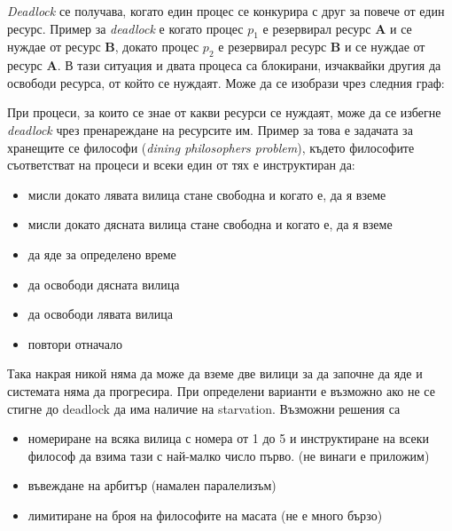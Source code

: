 \documentclass[fleqn,12pt]{article}
\begin{document}
\textit{Deadlock} се получава, когато един процес се конкурира с друг за повече от един ресурс.
Пример за \textit{deadlock} е когато процес \textbf{$p_1$} е резервирал ресурс \textbf{A} и се нуждае от ресурс \textbf{B}, докато процес \textbf{$p_2$} е резервирал ресурс \textbf{B} и се нуждае от ресурс \textbf{A}.
В тази ситуация и двата процеса са блокирани, изчаквайки другия да освободи ресурса, от който се нуждаят.
Може да се изобрази чрез следния граф:


\begin{center}
\end{center}

При процеси, за които се знае от какви ресурси се нуждаят, може да се избегне \textit{deadlock} чрез пренареждане на ресурсите им.
Пример за това е задачата за хранещите се философи (\textit{dining philosophers problem}), където философите съответстват на процеси и всеки един от тях е инструктиран да:
\begin{itemize}
    \item мисли докато лявата вилица стане свободна и когато е, да я вземе
    \item мисли докато дясната вилица стане свободна и когато е, да я вземе
    \item да яде за определено време
    \item да освободи дясната вилица
    \item да освободи лявата вилица
    \item повтори отначало
\end{itemize}

Така накрая никой няма да може да вземе две вилици за да започне да яде и системата няма да прогресира.
При определени варианти е възможно ако не се стигне до deadlock да има наличие на starvation.
Възможни решения са 

\begin{itemize}
    \item номериране на всяка вилица с номера от 1 до 5 и инструктиране на всеки философ да взима тази с най-малко число първо. (не винаги е приложим)
    \item въвеждане на арбитър (намален паралелизъм)
    \item лимитиране на броя на философите на масата (не е много бързо)
\end{itemize}
\end{document}
